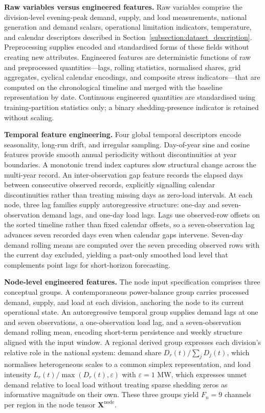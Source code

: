 \textbf{Raw variables versus engineered features.} Raw variables comprise the division-level evening-peak demand, supply, and load measurements, national generation and demand scalars, operational limitation indicators, temperature, and calendar descriptors described in Section~\ref{subsection:dataset_description}. Preprocessing supplies encoded and standardised forms of these fields without creating new attributes. Engineered features are deterministic functions of raw and preprocessed quantities---lags, rolling statistics, normalised shares, grid aggregates, cyclical calendar encodings, and composite stress indicators---that are computed on the chronological timeline and merged with the baseline representation by date. Continuous engineered quantities are standardised using training-partition statistics only; a binary shedding-presence indicator is retained without scaling.

\textbf{Temporal feature engineering.} Four global temporal descriptors encode seasonality, long-run drift, and irregular sampling. Day-of-year sine and cosine features provide smooth annual periodicity without discontinuities at year boundaries. A monotonic trend index captures slow structural change across the multi-year record. An inter-observation gap feature records the elapsed days between consecutive observed records, explicitly signalling calendar discontinuities rather than treating missing days as zero-load intervals. At each node, three lag families supply autoregressive structure: one-day and seven-observation demand lags, and one-day load lags. Lags use observed-row offsets on the sorted timeline rather than fixed calendar offsets, so a seven-observation lag advances seven recorded days even when calendar gaps intervene. Seven-day demand rolling means are computed over the seven preceding observed rows with the current day excluded, yielding a past-only smoothed load level that complements point lags for short-horizon forecasting.

\textbf{Node-level engineered features.} The node input specification comprises three conceptual groups. A contemporaneous power-balance group carries processed demand, supply, and load at each division, anchoring the node to its current operational state. An autoregressive temporal group supplies demand lags at one and seven observations, a one-observation load lag, and a seven-observation demand rolling mean, encoding short-term persistence and weekly structure aligned with the input window. A regional derived group expresses each division's relative role in the national system: demand share \(D_r(t) / \sum_{j} D_j(t)\), which normalises heterogeneous scales to a common simplex representation, and load intensity \(L_r(t) / \max(D_r(t), \varepsilon)\) with \(\varepsilon = 1\) MW, which expresses unmet demand relative to local load without treating sparse shedding zeros as informative magnitude on their own. These three groups yield \(F_n = 9\) channels per region in the node tensor \(\mathbf{X}^{\mathrm{node}}\).

